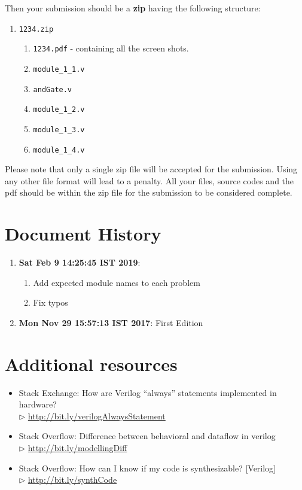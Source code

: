 \documentclass[a4paper,10pt]{article}
\theoremstyle{mytheor}
\newcommand{\inlinev}[1]{\lstinline[style=verilog-inline-style]{#1}}
\newcommand{\histitem}[2]{
  \footnotesize
  \item \textbf{#1}: #2
  \normalsize
}
\newcommand{\amurl}[1]{%
  {\color{blue}\url{#1}}
}
\begin{document}
Then your submission should be a \textbf{\color{blue}zip} having the
following structure:

\begin{enumerate}
\item \inlinev{1234.zip}
  \begin{enumerate}
  \item \inlinev{1234.pdf} - containing
    all the screen shots.
  \item \inlinev{module_1_1.v}
  \item \inlinev{andGate.v}
  \item \inlinev{module_1_2.v}
  \item \inlinev{module_1_3.v}
  \item \inlinev{module_1_4.v}
  \end{enumerate}
\end{enumerate}

Please note that only a single zip file will be accepted for the
submission. Using any other file format will lead to a
{\color{red}penalty}. All your files, source codes and the pdf should
be within the zip file for the submission to be considered complete.

\section*{Document History}
\begin{enumerate}
  \histitem{Sat Feb  9 14:25:45 IST 2019}{
    \begin{enumerate}
    \item Add expected module names to each problem
    \item Fix typos
    \end{enumerate}
  }
  \histitem{Mon Nov 29 15:57:13 IST 2017} {
    First Edition
  }
\end{enumerate}

\section*{Additional resources}
\begin{itemize}
  \small 
\item Stack Exchange: How are Verilog “always” statements implemented
  in hardware? \\$\rhd$ \amurl{http://bit.ly/verilogAlwaysStatement}
\item Stack Overflow: Difference between behavioral and dataflow in
  verilog \\$\rhd$ \amurl{http://bit.ly/modellingDiff}
\item Stack Overflow: How can I know if my code is synthesizable?
  [Verilog] \\$\rhd$ \amurl{http://bit.ly/synthCode}
\end{itemize} 
\end{document}
